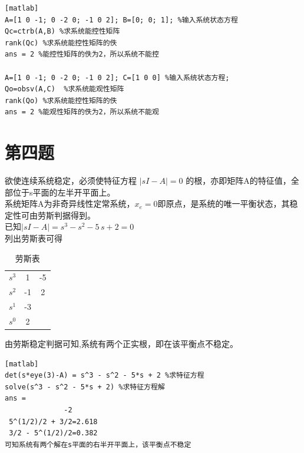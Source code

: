 \documentclass[a4paper]{article}
\begin{document}
\begin{verbatim}[matlab]
A=[1 0 -1; 0 -2 0; -1 0 2]; B=[0; 0; 1]; %输入系统状态方程
Qc=ctrb(A,B) %求系统能控性矩阵
rank(Qc) %求系统能控性矩阵的佚
ans = 2 %能控性矩阵的佚为2，所以系统不能控
 
A=[1 0 -1; 0 -2 0; -1 0 2]; C=[1 0 0] %输入系统状态方程;   
Qo=obsv(A,C)  %求系统能观性矩阵
rank(Qo) %求系统能控性矩阵的佚
ans = 2 %能观性矩阵的佚为2，所以系统不能观
\end{verbatim}
\section*{第四题}
欲使连续系统稳定，必须使特征方程 $|sI-A|=0$ 的根，亦即矩阵A的特征值，全部位于s平面的左半开平面上。
\\系统矩阵A为非奇异线性定常系统，$x_{e}=0$即原点，是系统的唯一平衡状态，其稳定性可由劳斯判据得到。
\\已知$|sI-A|=s^3 - s^2 - 5\, s + 2 =0 $
\\列出劳斯表可得
\begin{table}[!h]
\centering
\caption{劳斯表}
\begin{tabular}{c  c  c}  
$s^{3}$ & 1 & -5 \\ 
$s^{2}$ & -1 & 2 \\ 
$s^{1}$ & -3 & \\ 
$s^{0}$ & 2 & 
\end{tabular}
\end{table}
\noindent
由劳斯稳定判据可知,系统有两个正实根，即在该平衡点不稳定。

\begin{verbatim}[matlab] 
det(s*eye(3)-A) = s^3 - s^2 - 5*s + 2 %求特征方程
solve(s^3 - s^2 - 5*s + 2) %求特征方程解 
ans =
              -2
 5^(1/2)/2 + 3/2=2.618
 3/2 - 5^(1/2)/2=0.382
可知系统有两个解在s平面的右半开平面上，该平衡点不稳定
\end{verbatim}
\end{document}
